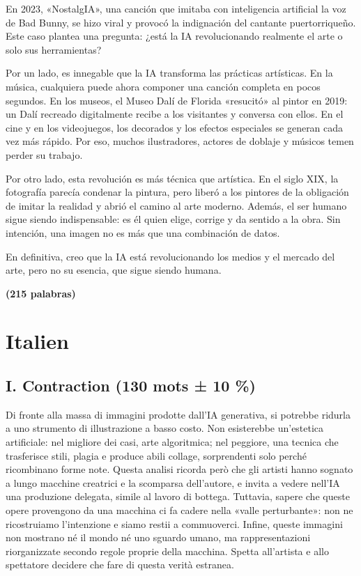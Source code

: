 \documentclass[11pt,a4paper]{article}
\begin{document}
En 2023, «NostalgIA», una canción que imitaba con inteligencia artificial la voz de Bad Bunny, se hizo viral y provocó la indignación del cantante puertorriqueño. Este caso plantea una pregunta: ¿está la IA revolucionando realmente el arte o solo sus herramientas?

Por un lado, es innegable que la IA transforma las prácticas artísticas. En la música, cualquiera puede ahora componer una canción completa en pocos segundos. En los museos, el Museo Dalí de Florida «resucitó» al pintor en 2019: un Dalí recreado digitalmente recibe a los visitantes y conversa con ellos. En el cine y en los videojuegos, los decorados y los efectos especiales se generan cada vez más rápido. Por eso, muchos ilustradores, actores de doblaje y músicos temen perder su trabajo.

Por otro lado, esta revolución es más técnica que artística. En el siglo XIX, la fotografía parecía condenar la pintura, pero liberó a los pintores de la obligación de imitar la realidad y abrió el camino al arte moderno. Además, el ser humano sigue siendo indispensable: es él quien elige, corrige y da sentido a la obra. Sin intención, una imagen no es más que una combinación de datos.

En definitiva, creo que la IA está revolucionando los medios y el mercado del arte, pero no su esencia, que sigue siendo humana.

\textbf{(215 palabras)}

\hypertarget{italien}{%
\section{Italien}\label{italien}}

\hypertarget{i.-contraction-130-mots-10-4}{%
\subsection{I. Contraction (130 mots ± 10 \%)}\label{i.-contraction-130-mots-10-4}}

Di fronte alla massa di immagini prodotte dall'IA generativa, si potrebbe ridurla a uno strumento di illustrazione a basso costo. Non esisterebbe un'estetica artificiale: nel migliore dei casi, arte algoritmica; nel peggiore, una tecnica che trasferisce stili, plagia e produce abili collage, sorprendenti solo perché ricombinano forme note. Questa analisi ricorda però che gli artisti hanno sognato a lungo macchine creatrici e la scomparsa dell'autore, e invita a vedere nell'IA una produzione delegata, simile al lavoro di bottega. Tuttavia, sapere che queste opere provengono da una macchina ci fa cadere nella «valle perturbante»: non ne ricostruiamo l'intenzione e siamo restii a commuoverci. Infine, queste immagini non mostrano né il mondo né uno sguardo umano, ma rappresentazioni riorganizzate secondo regole proprie della macchina. Spetta all'artista e allo spettatore decidere che fare di questa verità estranea.
\end{document}
